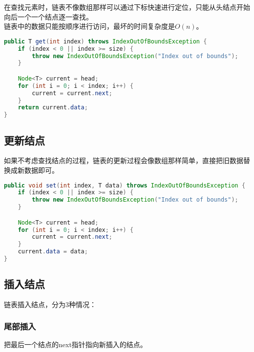 在查找元素时，链表不像数组那样可以通过下标快速进行定位，只能从头结点开始向后一个一个结点逐一查找。\\

链表中的数据只能按顺序进行访问，最坏的时间复杂度是$ O(n) $。\\


\begin{lstlisting}[language=Java]
public T get(int index) throws IndexOutOfBoundsException {
	if (index < 0 || index >= size) {
		throw new IndexOutOfBoundsException("Index out of bounds");
	}

	Node<T> current = head;
	for (int i = 0; i < index; i++) {
		current = current.next;
	}
	return current.data;
}
\end{lstlisting}

\vspace{0.5cm}

\subsection{更新结点}

如果不考虑查找结点的过程，链表的更新过程会像数组那样简单，直接把旧数据替换成新数据即可。\\


\begin{lstlisting}[language=Java]
public void set(int index, T data) throws IndexOutOfBoundsException {
	if (index < 0 || index >= size) {
		throw new IndexOutOfBoundsException("Index out of bounds");
	}

	Node<T> current = head;
	for (int i = 0; i < index; i++) {
		current = current.next;
	}
	current.data = data;
}
\end{lstlisting}

\vspace{0.5cm}

\subsection{插入结点}

链表插入结点，分为3种情况：

\subsubsection{尾部插入}

把最后一个结点的next指针指向新插入的结点。

